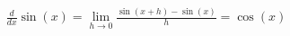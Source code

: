 \documentclass[preview]{standalone}
\begin{document}
\begin{align*}
\frac{d}{dx} \sin(x) = \lim_{h \to 0} \frac{\sin(x+h) - \sin(x)}{h} = \cos(x)
\end{align*}
\end{document}
